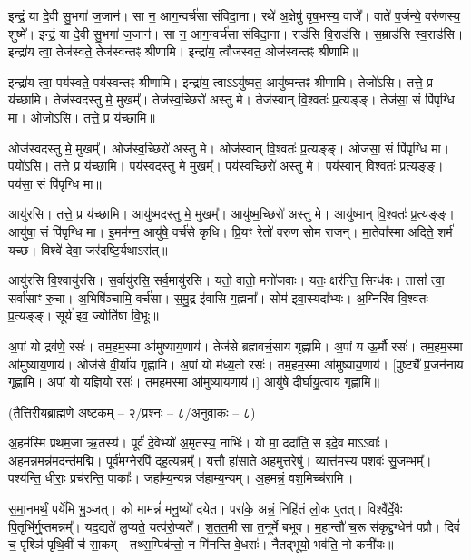 इन्द्रं॒ या दे॒वी सु॒भगा॑ ज॒जान॑।
सा न॒ आग॒न्वर्च॑सा संविदा॒ना।
रथे॑ अ॒क्षेषु॑ वृष॒भस्य॒ वाजे᳚।
वाते॑ प॒र्जन्ये॒ वरु॑णस्य॒ शुष्मे᳚।
इन्द्रं॒ या दे॒वी सु॒भगा॑ ज॒जान॑।
सा न॒ आग॒न्वर्च॑सा संविदा॒ना।
राड॑सि वि॒राड॑सि।
स॒म्राड॑सि स्व॒राड॑सि।
इन्द्रा॑य त्वा॒ तेज॑स्वते॒ तेज॑स्वन्तꣴ श्रीणामि।
इन्द्रा॑य॒ त्वौज॑स्वत॒ ओज॑स्वन्तꣴ श्रीणामि॥

इन्द्रा॑य त्वा॒ पय॑स्वते॒ पय॑स्वन्तꣴ श्रीणामि।
इन्द्रा॑य॒ त्वाऽऽयु॑ष्मत॒ आयु॑ष्मन्तꣴ श्रीणामि।
तेजो॑ऽसि।
तत्ते॒ प्र य॑च्छामि।
तेज॑स्वदस्तु मे॒ मुखम्᳚।
तेज॑स्व॒च्छिरो॑ अस्तु मे।
तेज॑स्वान् वि॒श्वतः॑ प्र॒त्यङ्ङ्।
तेज॑सा॒ सं पि॑पृग्धि मा।
ओजो॑ऽसि।
तत्ते॒ प्र य॑च्छामि॥

ओज॑स्वदस्तु मे॒ मुखम्᳚।
ओज॑स्व॒च्छिरो॑ अस्तु मे।
ओज॑स्वान् वि॒श्वतः॑ प्र॒त्यङ्ङ्।
ओज॑सा॒ सं पि॑पृग्धि मा।
पयो॑ऽसि।
तत्ते॒ प्र य॑च्छामि।
पय॑स्वदस्तु मे॒ मुखम्᳚।
पय॑स्व॒च्छिरो॑ अस्तु मे।
पय॑स्वान् वि॒श्वतः॑ प्र॒त्यङ्ङ्।
पय॑सा॒ सं पि॑पृग्धि मा॥

आयु॑रसि।
तत्ते॒ प्र य॑च्छामि।
आयु॑ष्मदस्तु मे॒ मुखम्᳚।
आयु॑ष्म॒च्छिरो॑ अस्तु मे।
आयु॑ष्मान् वि॒श्वतः॑ प्र॒त्यङ्ङ्।
आयु॑षा॒ सं पि॑पृग्धि मा।
इ॒मम॑ग्न॒ आयु॑षे॒ वर्च॑से कृधि।
प्रि॒यꣳ रेतो॑ वरुण सोम राजन्।
मा॒तेवा᳚स्मा अदिते॒ शर्म॑ यच्छ।
विश्वे॑ देवा॒ जर॑दष्टि॒र्यथाऽस॑त्॥

आयु॑रसि वि॒श्वायु॑रसि।
स॒र्वायु॑रसि॒ सर्व॒मायु॑रसि।
यतो॒ वातो॒ मनो॑जवाः।
यतः॒ क्षर॑न्ति॒ सिन्ध॑वः।
तासां᳚ त्वा॒ सर्वा॑साꣳ रु॒चा।
अ॒भिषि॑ञ्चामि॒ वर्च॑सा।
स॒मु॒द्र इ॑वासि ग॒ह्मना᳚।
सोम॑ इवा॒स्यदा᳚भ्यः।
अ॒ग्निरि॑व वि॒श्वतः॑ प्र॒त्यङ्ङ्।
सूर्य॑ इव॒ ज्योति॑षा वि॒भूः॥


अ॒पां यो द्रव॑णे॒ रसः॑।
तम॒हम॒स्मा आ॑मुष्याय॒णाय॑।
तेज॑से ब्रह्मवर्च॒साय॑ गृह्णामि।
अ॒पां य ऊ॒र्मौ रसः॑।
तम॒हम॒स्मा आ॑मुष्याय॒णाय॑।
ओज॑से वी॒र्या॑य गृह्णामि।
अ॒पां यो म॑ध्य॒तो रसः॑।
तम॒हम॒स्मा आ॑मुष्याय॒णाय॑।
[पुष्ट्यै᳚ प्र॒जन॑नाय गृह्णामि।
अ॒पां यो य॒ज्ञियो॒ रसः॑।
तम॒हम॒स्मा आ॑मुष्याय॒णाय॑।]
आयु॑षे दीर्घायु॒त्वाय॑ गृह्णामि॥

\centerline{\scriptsize (तैत्तिरीयब्राह्मणे अष्टकम् – २/प्रश्नः – ८/अनुवाकः – ८)}
अ॒हम॑स्मि प्रथम॒जा ऋ॒तस्य॑।
पूर्वं॑ दे॒वेभ्यो॑ अ॒मृत॑स्य॒ नाभिः॑।
यो मा॒ ददा॑ति॒ स इदे॒व माऽऽवाः᳚।
अ॒हमन्न॒मन्न॑म॒दन्त॑मद्मि।
पूर्व॑म॒ग्नेरपि॑ दह॒त्यन्नम्᳚।
य॒त्तौ हा॑साते अहमुत्त॒रेषु॑।
व्यात्त॑मस्य प॒शवः॑ सु॒जम्भम्᳚।
पश्य॑न्ति॒ धीराः॒ प्रच॑रन्ति॒ पाकाः᳚।
जहा᳚म्य॒न्यन्न ज॑हाम्य॒न्यम्।
अ॒हमन्नं॒ वश॒मिच्च॑रामि॥

स॒मा॒नमर्थं॒ पर्ये॑मि भु॒ञ्जत्।
को मामन्नं॑ मनु॒ष्यो॑ दयेत।
परा॑के॒ अन्नं॒ निहि॑तं लो॒क ए॒तत्।
विश्वै᳚र्दे॒वैः पि॒तृभि॑र्गु॒प्तमन्नम्᳚।
यद॒द्यते॑ लु॒प्यते॒ यत्प॑रो॒प्यते᳚।
श॒त॒त॒मी सा त॒नूर्मे॑ बभूव।
म॒हान्तौ॑ च॒रू स॑कृद्दु॒ग्धेन॑ पप्रौ।
दिवं॑ च॒ पृश्ञि॑ पृथि॒वीं च॑ सा॒कम्।
तथ्स॒म्पिब॑न्तो॒ न मि॑नन्ति वे॒धसः॑।
नैतद्भूयो॒ भव॑ति॒ नो कनी॑यः॥

